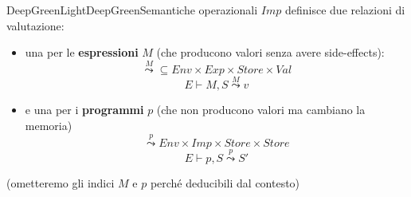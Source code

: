\documentclass[a4paper,11pt]{report}
\begin{document}
\begin{cdefframe}{DeepGreenLight}{DeepGreen}{Semantiche operazionali}{}
    \( Imp \) definisce due relazioni di valutazione: 
    \begin{itemize}
        \item una per le \textbf{espressioni} \( M \) (che producono valori senza avere side-effects):
            \[ \overset{M}{\leadsto} \subseteq  Env \times Exp \times Store \times Val \]
            \[ E \vdash M, S \overset{M}{\leadsto} v \]

        \item e una per i \textbf{programmi} \( p \) (che non producono valori ma cambiano la memoria)
            \[ \overset{p}{\leadsto} Env \times Imp \times Store \times Store \]
            \[ E \vdash p, S \overset{p}{\leadsto} S' \]
    \end{itemize}

    (ometteremo gli indici \( M \) e \( p \) perché deducibili dal contesto)
\end{cdefframe}
\end{document}
